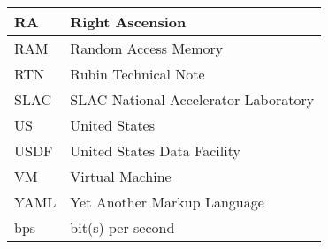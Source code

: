 \begin{longtable}{p{}p{}}
RA & Right Ascension \\\hline
RAM & Random Access Memory \\\hline
RTN & Rubin Technical Note \\\hline
SLAC & SLAC National Accelerator Laboratory \\\hline
US & United States \\\hline
USDF & United States Data Facility \\\hline
VM & Virtual Machine \\\hline
YAML & Yet Another Markup Language \\\hline
bps & bit(s) per second \\\hline
\end{longtable}
